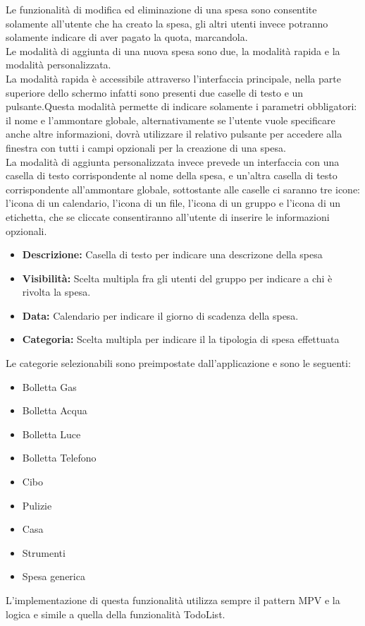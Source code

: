 Le funzionalità di modifica ed eliminazione di una spesa sono consentite solamente all'utente che ha creato la spesa, gli altri utenti invece potranno solamente indicare di aver pagato la quota, marcandola.\\
Le modalità di aggiunta di una nuova spesa sono due, la modalità rapida e la modalità personalizzata.\\
La modalità rapida è accessibile attraverso l'interfaccia principale, nella parte superiore dello schermo infatti sono presenti due caselle di testo e un pulsante.Questa modalità permette di indicare solamente i parametri obbligatori: il nome e l'ammontare globale, alternativamente se l'utente vuole specificare anche altre informazioni, dovrà utilizzare il relativo pulsante per accedere alla finestra con tutti i campi opzionali per la creazione di una spesa.\\
La modalità di aggiunta personalizzata invece prevede un interfaccia con una casella di testo corrispondente al nome della spesa, e un'altra casella di testo corrispondente all'ammontare globale, sottostante alle caselle ci saranno tre icone: l'icona di un calendario, l'icona di un file, l'icona di un gruppo e l'icona di un etichetta, che se cliccate consentiranno all'utente di inserire le informazioni opzionali.

\begin{itemize}
   \item \textbf{Descrizione:} Casella di testo per indicare una descrizone della spesa
   \item \textbf{Visibilità:} Scelta multipla fra gli utenti del gruppo per indicare a chi è rivolta la spesa.
   \item \textbf{Data:} Calendario per indicare il giorno di scadenza della spesa.
   \item \textbf{Categoria:} Scelta multipla per indicare il la tipologia di spesa effettuata
\end{itemize}
Le categorie selezionabili sono preimpostate dall'applicazione e sono le seguenti:
\begin{itemize}
    \item Bolletta Gas
    \item Bolletta Acqua
    \item Bolletta Luce
    \item Bolletta Telefono
    \item Cibo
    \item Pulizie
    \item Casa
    \item Strumenti
    \item Spesa generica
\end{itemize}
L'implementazione di questa funzionalità utilizza sempre il pattern MPV e la logica e simile a quella della funzionalità TodoList.


